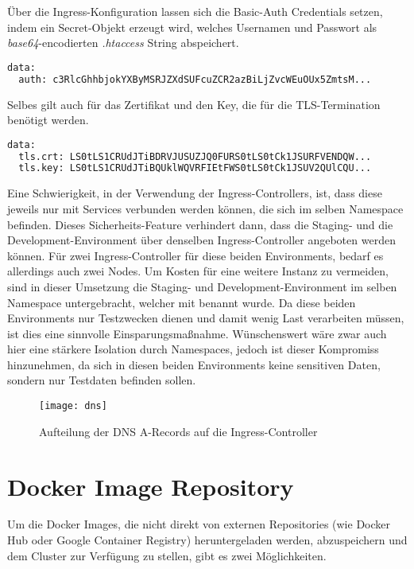 Über die Ingress-Konfiguration lassen sich die Basic-Auth Credentials setzen,
indem ein Secret-Objekt erzeugt wird, welches Usernamen und Passwort als
\emph{base64}-encodierten \emph{.htaccess} String abspeichert.

\begin{lstlisting}[language=Python,numbers=none]
data:
  auth: c3RlcGhhbjokYXByMSRJZXdSUFcuZCR2azBiLjZvcWEuOUx5ZmtsM...\end{lstlisting}

Selbes gilt auch für das Zertifikat und den Key, die für die TLS-Termination
benötigt werden.

\begin{lstlisting}[language=Python,numbers=none]
data:
  tls.crt: LS0tLS1CRUdJTiBDRVJUSUZJQ0FURS0tLS0tCk1JSURFVENDQW...
  tls.key: LS0tLS1CRUdJTiBQUklWQVRFIEtFWS0tLS0tCk1JSUV2QUlCQU...\end{lstlisting}

Eine Schwierigkeit, in der Verwendung der Ingress-Controllers, ist, dass diese
jeweils nur mit Services verbunden werden können, die sich im selben Namespace
befinden.
Dieses Sicherheits-Feature verhindert dann, dass die
Staging- und die Development-Environment
über denselben Ingress-Controller angeboten werden können.
Für zwei Ingress-Controller für diese beiden Environments, bedarf es allerdings
auch zwei Nodes. Um Kosten für eine weitere Instanz zu vermeiden, sind in dieser
Umsetzung die Staging- und Development-Environment im selben Namespace
untergebracht,
welcher mit  benannt wurde.
Da diese beiden Environments nur Testzwecken dienen und damit wenig Last
verarbeiten müssen, ist dies eine sinnvolle Einsparungsmaßnahme.
Wünschenswert wäre zwar auch hier eine stärkere Isolation durch Namespaces,
jedoch ist dieser
Kompromiss hinzunehmen, da sich in diesen beiden Environments keine sensitiven
Daten, sondern nur Testdaten befinden sollen.

\begin{figure}[H]
\centering
\texttt{[image: dns]}
\caption{Aufteilung der DNS A-Records auf die Ingress-Controller}
\end{figure}

\section{Docker Image Repository}

Um die Docker Images, die nicht direkt von externen Repositories
(wie Docker Hub oder Google Container Registry) heruntergeladen werden,
abzuspeichern und dem Cluster zur Verfügung zu stellen, gibt es zwei Möglichkeiten.


